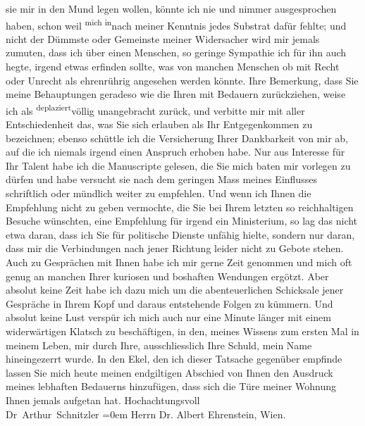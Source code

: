 \begin{ledgroupsized}[t]{13cm}
               sie mir in den Mund legen wollen, könnte ich nie und nimmer ausgesprochen haben,
               schon weil \substVorne{}\textsuperscript{mich in}{\allowbreak}\substDazwischen{}nach\substHinten{} meiner Kenntnis jedes Substrat dafür fehlte; und nicht der Dümmste oder
               Gemeinste meiner Widersacher wird mir jemals zumuten, dass ich über einen Menschen,
               so geringe Sympathie ich für ihn auch hegte, irgend etwas erfinden sollte, was von
               manchen Menschen ob mit Recht oder Unrecht als ehrenrührig angesehen werden könnte.
               Ihre Bemerkung, dass Sie meine Behauptungen geradeso wie die Ihren mit Bedauern
               zurückziehen, weise ich als \substVorne{}\textsuperscript{deplaziert}{\allowbreak}\substDazwischen{}völlig unangebracht\substHinten{} zurück, und verbitte mir mit aller Ent{\pb}schiedenheit
               das, was Sie sich erlauben als Ihr Entgegenkommen zu bezeichnen; ebenso schüttle ich
               die Versicherung Ihrer Dankbarkeit von mir ab, auf die ich niemals irgend einen
               Anspruch erhoben habe. Nur aus Interesse für Ihr Talent habe ich die Manuscripte
               gelesen, die Sie mich baten mir vorlegen zu dürfen und \introOben{}habe\introOben{}
               versucht sie nach dem geringen Mass meines Einflusses schriftlich oder mündlich
               weiter zu empfehlen. Und wenn ich Ihnen die Empfehlung nicht zu geben vermochte, die
               Sie bei Ihrem letzten so reichhaltigen Besuche wünschten, eine Empfehlung für irgend
               ein Ministerium, so lag das nicht etwa daran, dass ich Sie für politische Dienste
                   unfähig hielte, sondern nur daran, dass mir
               die Verbindungen nach jener Richtung leider nicht zu Gebote stehen. Auch zu
               Gesprächen mit Ihnen habe ich mir gerne Zeit genommen und mich oft genug an manchen
               Ihrer kuriosen und boshaften Wendungen ergötzt. Aber absolut keine Zeit habe ich dazu
               mich um die abenteuerlichen Schicksale jener Gespräche in Ihrem Kopf und daraus
               entstehende Fol{\pb}gen zu kümmern. Und absolut keine Lust verspür
               ich mich auch nur eine Minute länger mit einem widerwärtigen Klatsch zu beschäftigen,
               in den, meines Wissens zum ersten Mal in meinem Leben, \introOben{}mir
                  durch\introOben{} Ihre,
               ausschliesslich Ihre Schuld, mein Name hineingezerrt wurde. In den Ekel, den ich
               dieser Tatsache gegenüber empfinde lassen Sie mich heute meinen endgiltigen Abschied
               von Ihnen den Ausdruck meines lebhaften Bedauerns hinzufügen, dass sich die Türe
               meiner Wohnung Ihnen jemals aufgetan hat.\pend
           \pstart
           Hochachtungsvoll{\\[\baselineskip]}\spacefill\mbox{Dr Arthur Schnitzler}\pend
           \leftskip=0em{}\pstart
           \noindent{}Herrn Dr. Albert Ehrenstein, Wien.\pend
           
         
         \endnumbering{}\end{ledgroupsized}  \newcommand{\dateiname}{L02019}\newcommand{\titel}{Arthur Schnitzler an Albert Ehrenstein, 6. 5. 1911}\newcommand{\editorInnen}{Martin Anton Müller und Gerd-Hermann Susen}
      